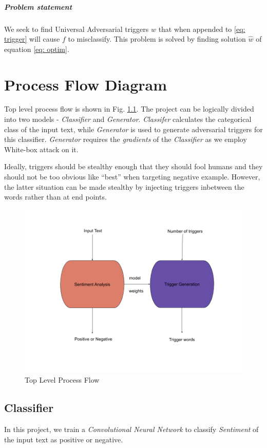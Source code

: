 \documentclass[12pt]{report}
\begin{document}
\begin{spacing}{1.5}
\paragraph{Problem statement}
We seek to find Universal Adversarial triggers $w$ that when appended to \ref{eq: trigger} will cause $f$ to misclassify. This problem is solved by finding solution $\hat{w}$ of equation \ref{eq: optim}.


\chapter{Process Flow Diagram}
Top level process flow is shown in Fig. \ref{img: top_level}. The project can be logically divided into two models - \textit{Classifier} and \textit{Generator}. \textit{Classifer} calculates the categorical class of the input text, while \textit{Generator} is used to generate adversarial triggers for this classifier. \textit{Generator} requires the \textit{gradients} of the \textit{Classifier} as we employ White-box attack on it.

Ideally, triggers should be stealthy enough that they should fool humans and they should not be too obvious like ``best'' when targeting negative example.
However, the latter situation can be made stealthy by injecting triggers inbetween the words rather than at end points.

\begin{figure}[!h]
  \centering
  \includegraphics[width=0.8\linewidth]{./img/top_level.png}
  \caption{Top Level Process Flow}
  \label{img: top_level}
\end{figure}


\section{Classifier}
In this project, we train a \textit{Convolutional Neural Network} to classify \textit{Sentiment} of the input text as positive or negative.

\end{spacing}
\end{document}
